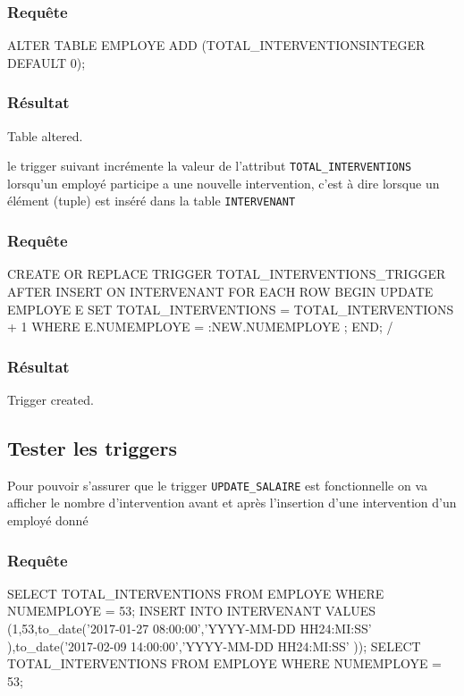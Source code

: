 \documentclass[•]{article}
\begin{document}
\subsubsection{Requête}
\begin{sql}
ALTER TABLE EMPLOYE ADD (TOTAL_INTERVENTIONSINTEGER DEFAULT 0);
\end{sql}

\subsubsection{Résultat}
\begin{sql}
Table altered.
\end{sql}

le trigger suivant incrémente la valeur de l'attribut \texttt{TOTAL\_INTERVENTIONS} lorsqu'un employé participe a une nouvelle intervention,
c'est à dire lorsque un élément (tuple) est inséré dans la table \texttt{INTERVENANT}

\subsubsection{Requête}
\begin{sql}
CREATE OR REPLACE TRIGGER TOTAL_INTERVENTIONS_TRIGGER
AFTER INSERT ON INTERVENANT
FOR EACH ROW
BEGIN
	UPDATE EMPLOYE E
	SET TOTAL_INTERVENTIONS = TOTAL_INTERVENTIONS + 1 
	WHERE E.NUMEMPLOYE = :NEW.NUMEMPLOYE ;
END;
/
\end{sql}

\subsubsection{Résultat}
\begin{sql}
Trigger created.
\end{sql}

\subsection{Tester les triggers}
Pour pouvoir s'assurer que le trigger \texttt{UPDATE\_SALAIRE} est fonctionnelle on va afficher le nombre d'intervention avant et après l'insertion d'une intervention d'un employé donné


\subsubsection{Requête}
\begin{sql}
SELECT TOTAL_INTERVENTIONS FROM EMPLOYE WHERE NUMEMPLOYE = 53;
INSERT INTO INTERVENANT VALUES (1,53,to_date('2017-01-27 08:00:00','YYYY-MM-DD HH24:MI:SS' ),to_date('2017-02-09 14:00:00','YYYY-MM-DD HH24:MI:SS' ));
SELECT TOTAL_INTERVENTIONS FROM EMPLOYE WHERE NUMEMPLOYE = 53;
\end{sql}
\end{document}
